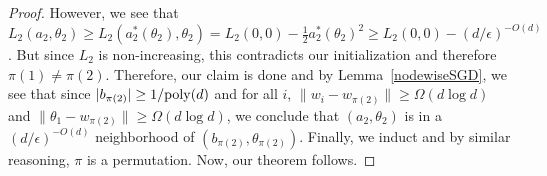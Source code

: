\begin{proof}
However, we see that $L_2(a_2, \theta_2) \geq L_2(a_2^*(\theta_2),\theta_2) = L_2(0,0) - \frac{1}{2}a_2^*(\theta_2)^2 \geq L_2(0,0) - (d/\epsilon)^{-O(d)}$. But since $L_2$ is non-increasing, this contradicts our initialization and therefore $\pi(1) \neq \pi(2)$. Therefore, our claim is done and by Lemma~\ref{nodewiseSGD}, we see that since $|b_{\pi(2)}| \geq 1/\mathrm{poly}(d)$ and for all $i$, $\|w_i - w_{\pi(2)}\| \geq \Omega(d \log d)$ and $\|\theta_1 - w_{\pi(2)}\| \geq \Omega(d\log d)$, we conclude that $(a_2,\theta_2)$ is in a $(d/\epsilon)^{-O(d)}$ neighborhood of $(b_{\pi(2)}, \theta_{\pi(2)})$. Finally, we induct and by similar reasoning, $\pi$ is a permutation. Now, our theorem follows. 
\end{proof}

